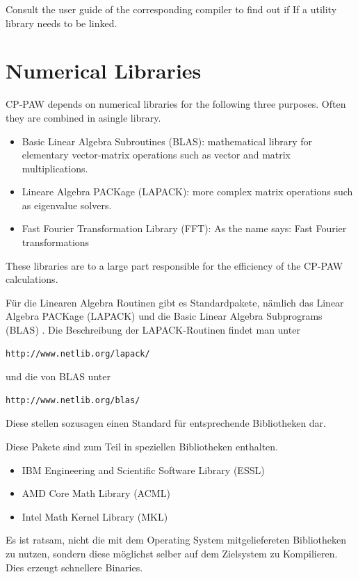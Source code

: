 \documentclass[a4paper,10pt]{report}
\begin{document}
Consult the user guide of the corresponding compiler to find out if
If a utility library needs to be linked.

\newpage
\section{Numerical Libraries}
\label{sec:libs}

CP-PAW depends on numerical libraries for the following three
purposes. Often they are combined in asingle library.
\begin{itemize}
\item Basic Linear Algebra Subroutines (BLAS):
mathematical library for elementary vector-matrix operations such as
vector and matrix multiplications.
\item Lineare Algebra PACKage (LAPACK): more complex
matrix operations such as eigenvalue solvers.
\item Fast Fourier Transformation Library (FFT):
As the name says: Fast Fourier transformations
\end{itemize}
These libraries are to a large part responsible for the efficiency of
the CP-PAW calculations.

F\"ur die Linearen Algebra Routinen gibt es Standardpakete, n\"amlich
das Linear Algebra PACKage (LAPACK) und die Basic Linear Algebra
Subprograms (BLAS) . Die Beschreibung der LAPACK-Routinen findet man
unter 
\begin{verbatim}
http://www.netlib.org/lapack/ 
\end{verbatim}
und die von BLAS unter
\begin{verbatim}
http://www.netlib.org/blas/
\end{verbatim}
 Diese stellen sozusagen einen Standard f\"ur entsprechende
Bibliotheken dar.

Diese Pakete sind zum Teil in speziellen Bibliotheken enthalten.
\begin{itemize}
\item IBM Engineering and Scientific Software Library (ESSL)
\item AMD Core Math Library (ACML)
\item Intel Math Kernel Library (MKL)
\end{itemize}

Es ist ratsam, nicht die mit dem Operating System mitgeliefereten
Bibliotheken zu nutzen, sondern diese m\"oglichst selber auf dem
Zielsystem zu Kompilieren. Dies erzeugt schnellere Binaries.
\end{document}
